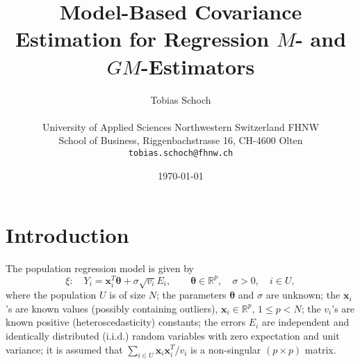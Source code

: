 \documentclass[a4paper,oneside,11pt,DIV=12]{scrartcl}
\theoremstyle{remark}
\newcommand{\R}{\mathbb{R}}
\begin{document}

\title{\Large Model-Based Covariance Estimation for Regression $M$- and
    $GM$-Estimators}

\author{{\normalsize Tobias Schoch} \\
\begin{minipage}[t][][t]{\textwidth}
	\begin{center}
	\small{University of Applied Sciences Northwestern Switzerland FHNW} \\
	\small{School of Business, Riggenbachstrasse 16, CH-4600 Olten} \\
	\small{\texttt{tobias.schoch{@}fhnw.ch}}
	\end{center}
\end{minipage}}

\date{{\small \today}}
\maketitle

\renewenvironment{abstract}{%
\begin{center}\begin{minipage}{0.9\textwidth}
\rule{\textwidth}{0.4pt}
{\sffamily\bfseries\footnotesize Abstract.}\small}
{\par\noindent\rule{\textwidth}{0.4pt}\end{minipage}\end{center}}

\section{Introduction}\label{ch:introduction}
The population regression model is given by
\begin{equation*}
    \xi: \quad Y_i = \bm x_i^T \bm{\theta} + \sigma \sqrt{v_i}E_i,
    \qquad \bm{\theta} \in \R^p, \quad \sigma > 0, \quad i \in U,
\end{equation*}
\noindent where the population $U$ is of size $N$; the parameters
$\bm{\theta}$ and $\sigma$ are unknown; the $\bm x_i$'s are known
values (possibly containing outliers), $\bm x_i \in \R^p$, $1 \leq p < N$;
the $v_i$'s are known positive (heteroscedasticity) constants; the errors $E_i$
are independent and identically distributed (i.i.d.) random variables with zero
expectation and unit variance; it is assumed that $\sum_{i \in U} \bm x_i
\bm x_i^T / v_i$ is a non-singular $(p \times p)$ matrix.
\end{document}
